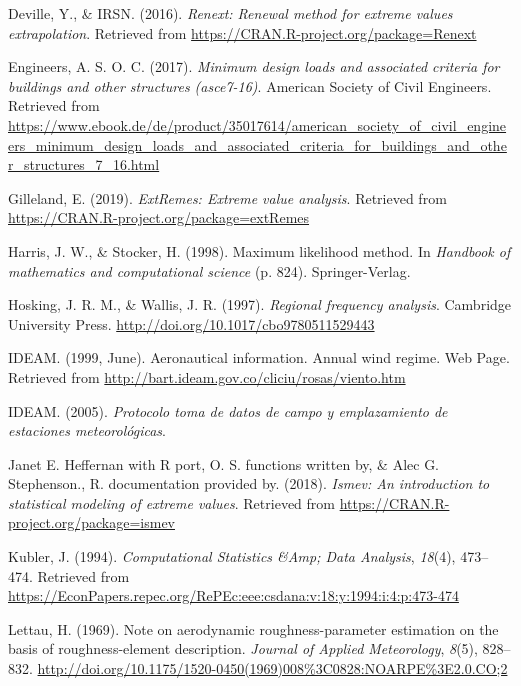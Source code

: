 \documentclass[12pt,oneside]{reedthesis}
\begin{document}
\leavevmode\hypertarget{ref-Deville2016}{}%
Deville, Y., \& IRSN. (2016). \emph{Renext: Renewal method for extreme values extrapolation}. Retrieved from \url{https://CRAN.R-project.org/package=Renext}

\leavevmode\hypertarget{ref-Asce2017}{}%
Engineers, A. S. O. C. (2017). \emph{Minimum design loads and associated criteria for buildings and other structures (asce7-16)}. American Society of Civil Engineers. Retrieved from \url{https://www.ebook.de/de/product/35017614/american_society_of_civil_engineers_minimum_design_loads_and_associated_criteria_for_buildings_and_other_structures_7_16.html}

\leavevmode\hypertarget{ref-Gilleland2019}{}%
Gilleland, E. (2019). \emph{ExtRemes: Extreme value analysis}. Retrieved from \url{https://CRAN.R-project.org/package=extRemes}

\leavevmode\hypertarget{ref-Harris1994}{}%
Harris, J. W., \& Stocker, H. (1998). Maximum likelihood method. In \emph{Handbook of mathematics and computational science} (p. 824). Springer-Verlag.

\leavevmode\hypertarget{ref-Hosking1997}{}%
Hosking, J. R. M., \& Wallis, J. R. (1997). \emph{Regional frequency analysis}. Cambridge University Press. \url{http://doi.org/10.1017/cbo9780511529443}

\leavevmode\hypertarget{ref-ideam1999}{}%
IDEAM. (1999, June). Aeronautical information. Annual wind regime. Web Page. Retrieved from \url{http://bart.ideam.gov.co/cliciu/rosas/viento.htm}

\leavevmode\hypertarget{ref-ideam2005}{}%
IDEAM. (2005). \emph{Protocolo toma de datos de campo y emplazamiento de estaciones meteorológicas}.

\leavevmode\hypertarget{ref-JanetE.HeffernanwithRport2018}{}%
Janet E. Heffernan with R port, O. S. functions written by, \& Alec G. Stephenson., R. documentation provided by. (2018). \emph{Ismev: An introduction to statistical modeling of extreme values}. Retrieved from \url{https://CRAN.R-project.org/package=ismev}

\leavevmode\hypertarget{ref-Kubler1994}{}%
Kubler, J. (1994). \emph{Computational Statistics \&Amp; Data Analysis}, \emph{18}(4), 473--474. Retrieved from \url{https://EconPapers.repec.org/RePEc:eee:csdana:v:18:y:1994:i:4:p:473-474}

\leavevmode\hypertarget{ref-Lettau1969}{}%
Lettau, H. (1969). Note on aerodynamic roughness-parameter estimation on the basis of roughness-element description. \emph{Journal of Applied Meteorology}, \emph{8}(5), 828--832. \url{http://doi.org/10.1175/1520-0450(1969)008\%3C0828:NOARPE\%3E2.0.CO;2}
\end{document}
